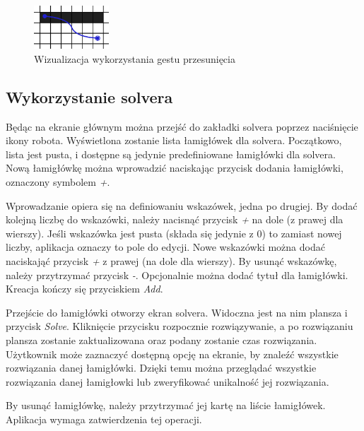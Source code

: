 \begin{figure}[!htb]
    \centering
    \includegraphics[width=0.25\textwidth]{images/swipe_gesture.png}
    \caption{Wizualizacja wykorzystania gestu przesunięcia}
\end{figure}


\subsection{Wykorzystanie solvera}
    Będąc na ekranie głównym można przejść do zakładki solvera poprzez naciśnięcie ikony robota.
Wyświetlona zostanie lista łamigłówek dla solvera. Początkowo, lista jest pusta, i dostępne są jedynie
predefiniowane łamigłówki dla solvera. Nową łamigłówkę można wprowadzić naciskając przycisk dodania
łamigłówki, oznaczony symbolem \textit{+}.

    Wprowadzanie opiera się na definiowaniu wskazówek, jedna po drugiej. By dodać kolejną liczbę do
wskazówki, należy nacisnąć przycisk \textit{+} na dole (z prawej dla wierszy). Jeśli wskazówka jest 
pusta (składa się jedynie z 0) to zamiast nowej liczby, aplikacja oznaczy to pole do edycji. 
Nowe wskazówki można dodać naciskająć przycisk \textit{+} z prawej (na dole dla wierszy). 
By usunąć wskazówkę, należy przytrzymać przycisk \textit{-}. Opcjonalnie można dodać tytuł dla łamigłówki.
Kreacja kończy się przyciskiem \textit{Add}.

    Przejście do łamigłówki otworzy ekran solvera. Widoczna jest na nim plansza i przycisk \textit{Solve}.
Kliknięcie przycisku rozpocznie rozwiązywanie, a po rozwiązaniu plansza zostanie zaktualizowana oraz
podany zostanie czas rozwiązania. Użytkownik może zaznaczyć dostępną opcję na ekranie, by znaleźć
wszystkie rozwiązania danej łamigłówki. Dzięki temu można przeglądać wszystkie rozwiązania danej łamigłowki
lub zweryfikować unikalność jej rozwiązania.

    By usunąć łamigłówkę, należy przytrzymać jej kartę na liście łamigłówek. Aplikacja wymaga
zatwierdzenia tej operacji.
